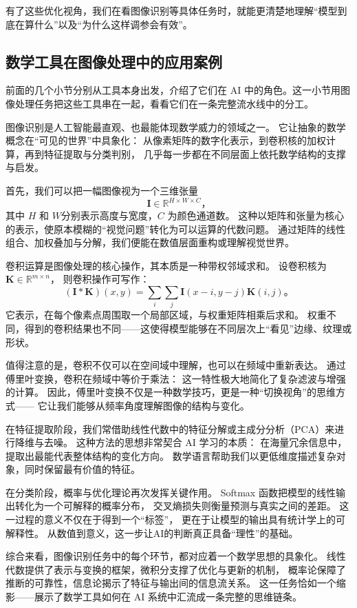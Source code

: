 有了这些优化视角，我们在看图像识别等具体任务时，就能更清楚地理解“模型到底在算什么”以及“为什么这样调参会有效”。

\subsection{数学工具在图像处理中的应用案例}
前面的几个小节分别从工具本身出发，介绍了它们在 AI 中的角色。这一小节用图像处理任务把这些工具串在一起，看看它们在一条完整流水线中的分工。

图像识别是人工智能最直观、也最能体现数学威力的领域之一。  
它让抽象的数学概念在“可见的世界”中具象化：  
从像素矩阵的数字化表示，到卷积核的加权计算，再到特征提取与分类判别，  
几乎每一步都在不同层面上依托数学结构的支撑与启发。

首先，我们可以把一幅图像视为一个三维张量  
$$\mathbf{I} \in \mathbb{R}^{H \times W \times C}，$$  
其中 $H$ 和 $W$分别表示高度与宽度，$C$ 为颜色通道数。  
这种以矩阵和张量为核心的表示，使原本模糊的“视觉问题”转化为可以运算的代数问题。  
通过矩阵的线性组合、加权叠加与分解，我们便能在数值层面重构或理解视觉世界。

卷积运算是图像处理的核心操作，其本质是一种带权邻域求和。  
设卷积核为 $\mathbf{K} \in \mathbb{R}^{m \times n}$，  
则卷积操作可写作：
$$
(\mathbf{I} * \mathbf{K})(x, y) = \sum_i \sum_j \mathbf{I}(x-i, y-j)\mathbf{K}(i, j)。
$$  
它表示，在每个像素点周围取一个局部区域，与权重矩阵相乘后求和。  
权重不同，得到的卷积结果也不同——这使得模型能够在不同层次上“看见”边缘、纹理或形状。

值得注意的是，卷积不仅可以在空间域中理解，也可以在频域中重新表达。  
通过傅里叶变换，卷积在频域中等价于乘法：  
这一特性极大地简化了复杂滤波与增强的计算。  
因此，傅里叶变换不仅是一种数学技巧，更是一种“切换视角”的思维方式——  
它让我们能够从频率角度理解图像的结构与变化。

在特征提取阶段，我们常借助线性代数中的特征分解或主成分分析（PCA）来进行降维与去噪。  
这种方法的思想非常契合 AI 学习的本质：  
在海量冗余信息中，提取出最能代表整体结构的变化方向。  
数学语言帮助我们以更低维度描述复杂对象，同时保留最有价值的特征。

在分类阶段，概率与优化理论再次发挥关键作用。  
Softmax 函数把模型的线性输出转化为一个可解释的概率分布，  
交叉熵损失则衡量预测与真实之间的差距。  
这一过程的意义不仅在于得到一个“标签”，  
更在于让模型的输出具有统计学上的可解释性。  
从数值到意义，这一步让AI的判断真正具备“理性”的基础。

综合来看，图像识别任务中的每个环节，都对应着一个数学思想的具象化。  
线性代数提供了表示与变换的框架，微积分支撑了优化与更新的机制，  
概率论保障了推断的可靠性，信息论揭示了特征与输出间的信息流关系。  
这一任务恰如一个缩影——展示了数学工具如何在 AI 系统中汇流成一条完整的思维链条。

